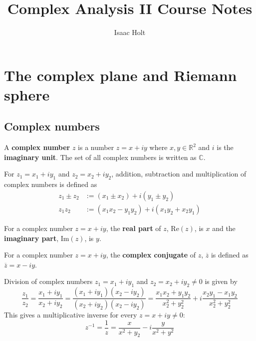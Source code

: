 

\title{Complex Analysis II Course Notes}
\author{Isaac Holt}





\section{The complex plane and Riemann sphere}

\subsection{Complex numbers}

\begin{definition}
	A \textbf{complex number} $z$ is a number $z = x + iy$ where $x, y \in \mathbb{R}^2$ and $i$ is the \textbf{imaginary unit}. The set of all complex numbers is written as $\mathbb{C}$.
\end{definition}

\begin{definition}
	For $z_1 = x_1 + i y_1$ and $z_2 = x_2 + i y_2$, addition, subtraction and multiplication of complex numbers is defined as
	\[
		\begin{aligned}
			z_1 \pm z_2 & := (x_1 \pm x_2) + i (y_1 \pm y_2) \\
			z_1 z_2 & := (x_1 x_2 - y_1 y_2) + i (x_1 y_2 + x_2 y_1)
		\end{aligned}
	\]
\end{definition}

\begin{definition}
	For a complex number $z = x + iy$, the \textbf{real part} of $z$, $\text{Re}(z)$, is $x$ and the \textbf{imaginary part}, $\text{Im}(z)$, is $y$.
\end{definition}

\begin{definition}
	For a complex number $z = x + iy$, the \textbf{complex conjugate} of $z$, $\overline{z}$ is defined as $\overline{z} = x - iy$.
\end{definition}

\begin{definition}
	Division of complex numbers $z_1 = x_1 + i y_1$ and $z_2 = x_2 + i y_2 \ne 0$ is given by
	\[
		\frac{z_1}{z_2} = \frac{x_1 + i y_1}{x_2 + i y_2} = \frac{(x_1 + i y_1) (x_2 - i y_2)}{(x_2 + i y_2) (x_2 - i y_2)} = \frac{x_1 x_2 + y_1 y_2}{x_2^2 + y_2^2} + i \frac{x_2 y_1 - x_1 y_2}{x_2^2 + y_2^2}
	\]
	This gives a multiplicative inverse for every $z = x + iy \ne 0$:
	\[
		z^{-1} = \frac{1}{z} = \frac{x}{x^2 + y_2} - i \frac{y}{x^2 + y^2}
	\]
\end{definition}

